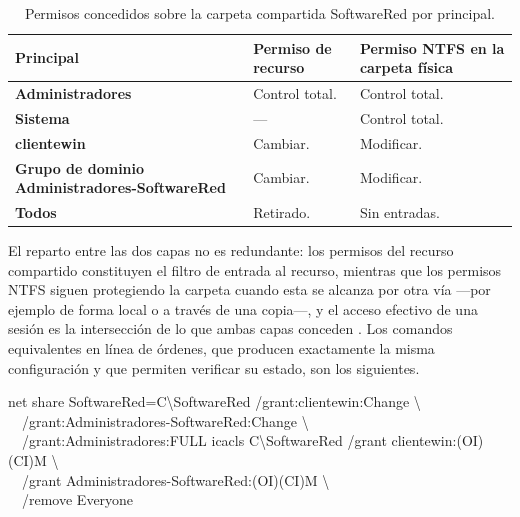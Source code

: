 \documentclass[12pt]{article}
\begin{document}
\begin{table}[H]
\centering
\small
\renewcommand{\arraystretch}{1.15}
\renewcommand{\tabularxcolumn}[1]{m{#1}}
\setlength{\emergencystretch}{1.5em}
\caption{Permisos concedidos sobre la carpeta compartida SoftwareRed por principal.}
\label{tab:permisosSoftwareRed}
\begin{tabularx}{\textwidth}{>{\centering\arraybackslash}m{3.8cm} m{3.0cm} X}
\toprule
\textbf{Principal} & \textbf{Permiso de recurso} & \textbf{Permiso NTFS en la carpeta física} \\
\midrule
\textbf{Administradores} & Control total. & Control total. \\
\addlinespace
\textbf{Sistema} & --- & Control total. \\
\addlinespace
\textbf{clientewin} & Cambiar. & Modificar. \\
\addlinespace
\textbf{Grupo de dominio Administradores-SoftwareRed} & Cambiar. & Modificar. \\
\addlinespace
\textbf{Todos} & Retirado. & Sin entradas. \\
\bottomrule
\end{tabularx}
\end{table}

El reparto entre las dos capas no es redundante: los permisos del recurso compartido constituyen el filtro de entrada al recurso, mientras que los permisos NTFS siguen protegiendo la carpeta cuando esta se alcanza por otra vía ---por ejemplo de forma local o a través de una copia---, y el acceso efectivo de una sesión es la intersección de lo que ambas capas conceden \parencite{microsoftShareNtfsPermissions}. Los comandos equivalentes en línea de órdenes, que producen exactamente la misma configuración y que permiten verificar su estado, son los siguientes.

\begin{mdframed}[style=terminal]
\ttfamily\upshape\color{bashLetterColor}\footnotesize
net share SoftwareRed=C\textbackslash SoftwareRed /grant:clientewin:Change \textbackslash\\
\ \ /grant:Administradores-SoftwareRed:Change \textbackslash\\
\ \ /grant:Administradores:FULL
icacls C\textbackslash SoftwareRed /grant clientewin:(OI)(CI)M \textbackslash\\
\ \ /grant Administradores-SoftwareRed:(OI)(CI)M \textbackslash\\
\ \ /remove Everyone
\end{mdframed}
\end{document}
